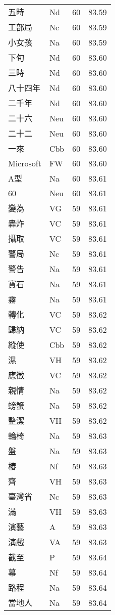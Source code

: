 \documentclass[twocolumn]{book}
\begin{document}
\begin{supertabular}{llrr}
五時 & Nd & 60 &  83.59\\
工部局 & Nc & 60 &  83.59\\
小女孩 & Na & 60 &  83.59\\
下旬 & Nd & 60 &  83.60\\
三時 & Nd & 60 &  83.60\\
八十四年 & Nd & 60 &  83.60\\
二千年 & Nd & 60 &  83.60\\
二十六 & Neu & 60 &  83.60\\
二十二 & Neu & 60 &  83.60\\
一來 & Cbb & 60 &  83.60\\
Microsoft & FW & 60 &  83.60\\
A型 & Na & 60 &  83.61\\
60 & Neu & 60 &  83.61\\
變為 & VG & 59 &  83.61\\
轟炸 & VC & 59 &  83.61\\
攝取 & VC & 59 &  83.61\\
警局 & Nc & 59 &  83.61\\
警告 & Na & 59 &  83.61\\
寶石 & Na & 59 &  83.61\\
霧 & Na & 59 &  83.61\\
轉化 & VC & 59 &  83.62\\
歸納 & VC & 59 &  83.62\\
縱使 & Cbb & 59 &  83.62\\
濕 & VH & 59 &  83.62\\
應徵 & VC & 59 &  83.62\\
親情 & Na & 59 &  83.62\\
螃蟹 & Na & 59 &  83.62\\
整潔 & VH & 59 &  83.62\\
輪椅 & Na & 59 &  83.63\\
盤 & Na & 59 &  83.63\\
樁 & Nf & 59 &  83.63\\
齊 & VH & 59 &  83.63\\
臺灣省 & Nc & 59 &  83.63\\
滿 & VH & 59 &  83.63\\
演藝 & A & 59 &  83.63\\
演戲 & VA & 59 &  83.63\\
截至 & P & 59 &  83.64\\
幕 & Nf & 59 &  83.64\\
路程 & Na & 59 &  83.64\\
當地人 & Na & 59 &  83.64\\

\end{supertabular}
\end{document}
